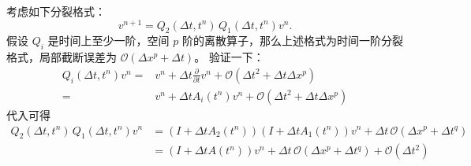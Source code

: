 考虑如下分裂格式：
\[
    v^{n+1} =  Q_2(\Delta t,t^n)\, Q_1(\Delta t,t^n) v^n.
\]
假设 $Q_i$ 是时间上至少一阶，空间 $p$ 阶的离散算子，那么上述格式为时间一阶分裂格式，局部截断误差为 $\mathcal{O}(\Delta x^p + \Delta t)$。
验证一下：
\begin{align*}
    Q_i(\Delta t,t^n)v^n
    ={} & v^n  + \Delta t \frac{\partial}{\partial t}v^n  + \mathcal{O}(\Delta t^2 + \Delta t \Delta x^p) \\
    ={} & v^n  + \Delta t A_i(t^n)v^n  + \mathcal{O}(\Delta t^2 + \Delta t \Delta x^p)
\end{align*}
代入可得
\begin{align*}
    Q_2(\Delta t,t^n)\, Q_1(\Delta t,t^n) v^n
     & = (I + \Delta t A_2(t^n)) (I + \Delta t A_1(t^n)) v^n + \Delta t\, \mathcal{O}(\Delta x^p + \Delta t^q) \\
     & = (I + \Delta t A(t^n)) v^n + \Delta t\, \mathcal{O}(\Delta x^p + \Delta t^q) + \mathcal{O}(\Delta t^2)
\end{align*}


